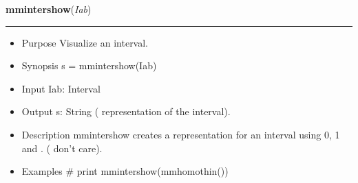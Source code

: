     \begin{boxedminipage}{\textwidth}

    \raggedright \textbf{mmintershow}(\textit{Iab})

    \vspace{-1.5ex}

    \rule{\textwidth}{0.5\fboxrule}
    \begin{itemize}
    \setlength{\parskip}{0.6ex}
      \item Purpose Visualize an interval.

      \item Synopsis s = mmintershow(Iab)

      \item Input Iab: Interval

      \item Output s: String ( representation of the interval).

      \item Description mmintershow creates a representation for an interval 
        using 0, 1 and . ( don't care).

      \item Examples \# print mmintershow(mmhomothin())

    \end{itemize}

    \vspace{1ex}

    \end{boxedminipage}

    \label{multireg:num_pymorph:mmis}
    \vspace{0.5ex}

